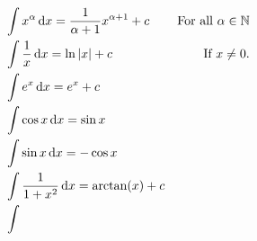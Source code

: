 \begin{theorem}
    \begin{align}
        & \int x^\alpha \mathop{}\!\mathrm{d} x = \frac{1}{\alpha + 1}x^{\alpha + 1} + c & \text{For all \(\alpha \in \mathbb{N}\)}\\
        & \int \frac{1}{x} \mathop{}\!\mathrm{d} x = \ln |x| + c & \text{If \(x \neq 0\).} \\
        & \int e^x \mathop{}\!\mathrm{d} x = e^x + c & \\
        & \int \cos x \mathop{}\!\mathrm{d} x = \sin x & \\
        & \int \sin x \mathop{}\!\mathrm{d} x = -\cos x & \\
        & \int \frac{1}{1 + x^2} \mathop{}\!\mathrm{d} x = \arctan(x) + c & \\
        & \int 
    \end{align}
\end{theorem}